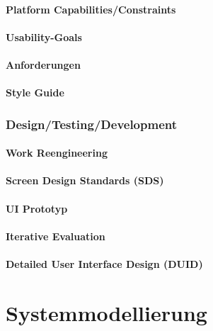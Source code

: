 \documentclass[a4paper,11pt]{article}%
\renewcommand{\\}{\vspace*{0.5\baselineskip} \newline}
\begin{document}
\subsection{Platform Capabilities/Constraints}

\subsection{Usability-Goals}

\subsection{Anforderungen}

\subsection{Style Guide}

\newpage

\section{Design/Testing/Development}

\subsection{Work Reengineering}

\subsection{Screen Design Standards (SDS)}

\subsection{UI Prototyp}

\subsection{Iterative Evaluation}

\subsection{Detailed User Interface Design (DUID)}

\newpage
\vspace*{\fill}
\part{Systemmodellierung}
\vfill
\newpage
\end{document}
